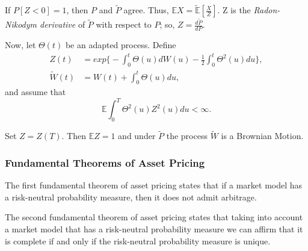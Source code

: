 \documentclass[paper=a4, fontsize=12pt]{scrartcl} %
\numberwithin{equation}{section}
\begin{document}
If $P[Z<0] = 1$, then $P$ and $\widetilde{P}$ agree. Thus, $\mathbb{E}X = \widetilde{\mathbb{E}} [\frac{X}{Z}]$.
Z is the \textit{Radon-Nikodym derivative} of $\widetilde{P}$ with respect to $P$; so, $Z = \frac{d\widetilde{P}}{dP}$.

Now, let $\Theta(t)$ be an adapted process. Define
	\begin{equation}
	\begin{aligned}
		Z(t) &= exp \bigg\{ -\int_0^t \Theta(u) dW(u) - \frac{1}{2} \int_0^t \Theta^2(u) du \bigg\}, \\
		\widetilde{W}(t) &= W(t) + \int_0^t \Theta(u) du,
	\end{aligned}
	\end{equation}	
and assume that 
	\begin{equation}
		\mathbb{E} \int_0^T \Theta^2(u)Z^2(u) du < \infty.
	\end{equation}

Set $Z = Z(T)$. Then $\mathbb{E}Z = 1$ and under $\widetilde{P}$ the process $\widetilde{W}$ is a Brownian Motion.	

\subsubsection{Fundamental Theorems of Asset Pricing}
The first fundamental theorem of asset pricing states that if a market model has a risk-neutral probability measure, then it does not admit arbitrage.\par
The second fundamental theorem of asset pricing states that taking into account a market model that has a risk-neutral probability measure we can affirm that it is complete if and only if the risk-neutral probability measure is unique. 
\end{document}
